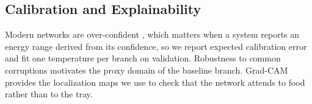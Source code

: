 \subsection{Calibration and Explainability}
Modern networks are over-confident \cite{guo2017calibration}, which matters when
a system reports an energy range derived from its confidence, so we report
expected calibration error and fit one temperature per branch on validation.
Robustness to common corruptions \cite{hendrycks2019robustness} motivates the
proxy domain of the baseline branch. Grad-CAM \cite{selvaraju2017gradcam}
provides the localization maps we use to check that the network attends to food
rather than to the tray.

